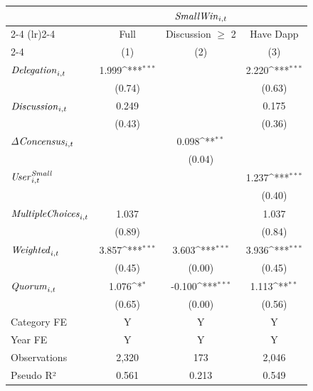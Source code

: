 {
\def\sym#1{\ifmmode^{#1}\else\(^{#1}\)\fi}
\begin{tabular}{l*{3}{c}}
\toprule
                    &\multicolumn{3}{c}{${\it Small Win}_{i,t}$}                      \\\cmidrule(lr){2-4}
\cmidrule(lr){2-4} & \multicolumn{1}{c}{Full} & \multicolumn{1}{c}{Discussion $\geq$ 2} & \multicolumn{1}{c}{Have Dapp} \\ \cmidrule(lr){2-4} & \multicolumn{1}{c}{(1)} & \multicolumn{1}{c}{(2)} & \multicolumn{1}{c}{(3)} \\ \midrule
${\it Delegation}_{i,t}$&       1.999\sym{***}&                     &       2.220\sym{***}\\
                    &      (0.74)         &                     &      (0.63)         \\
${\it Discussion}_{i,t}$&       0.249         &                     &       0.175         \\
                    &      (0.43)         &                     &      (0.36)         \\
${\it \Delta Concensus}_{i,t}$&                     &       0.098\sym{**} &                     \\
                    &                     &      (0.04)         &                     \\
${\it User}_{i,t}^{\it Small}$&                     &                     &       1.237\sym{***}\\
                    &                     &                     &      (0.40)         \\
${\it Multiple Choices}_{i,t}$&       1.037         &                     &       1.037         \\
                    &      (0.89)         &                     &      (0.84)         \\
${\it Weighted}_{i,t}$&       3.857\sym{***}&       3.603\sym{***}&       3.936\sym{***}\\
                    &      (0.45)         &      (0.00)         &      (0.45)         \\
${\it Quorum}_{i,t}$&       1.076\sym{*}  &      -0.100\sym{***}&       1.113\sym{**} \\
                    &      (0.65)         &      (0.00)         &      (0.56)         \\
\midrule
Category FE         &           Y         &           Y         &           Y         \\
Year FE             &           Y         &           Y         &           Y         \\
Observations        &       2,320         &         173         &       2,046         \\
Pseudo R²           &       0.561         &       0.213         &       0.549         \\
\bottomrule
\end{tabular}
}
